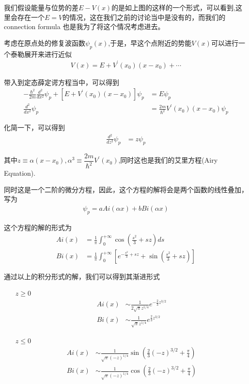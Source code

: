 \documentclass{article}
\begin{document}
我们假设能量与位势的差$E-V(x)$的是如上图的这样的一个形式，可以看到,这里会存在一个$E=V$的情况，这在我们之前的讨论当中是没有的，而我们的 connection formula 也是我为了将这个情况考虑进去。

考虑在原点处的修复波函数$\psi_p(x)$,于是，早这个点附近的势能$V(x)$可以进行一个泰勒展开来进行近似
\begin{align*}
    V(x)=E+V^\prime(x_0)(x-x_0)+\cdots
\end{align*}

带入到定态薛定谔方程当中，可以得到
\begin{align*}
    -\frac{\hbar^2}{2m}\frac{d^2}{dx^2}\psi_p+\left[E+V^\prime(x_0)(x-x_0)\right]\psi_p&=E\psi_p\\
    \frac{d^2}{dx^2}\psi_p&= \frac{2m}{\hbar^2}V^\prime(x_0)(x-x_0)\psi_p
\end{align*}

化简一下，可以得到
\begin{align*}
    \frac{d^2}{dz^2}\psi_p&= z\psi_p
\end{align*}

其中$z\equiv \alpha(x-x_0),\alpha^3\equiv \dfrac{2m}{\hbar^2}V^\prime(x_0)$,同时这也是我们的艾里方程(Airy Equation).

同时这是一个二阶的微分方程，因此，这个方程的解将会是两个函数的线性叠加，写为
\begin{align*}
    \psi_p=aAi(\alpha x)+bBi(\alpha x) 
\end{align*}

这个方程的解的形式为
\begin{align*}
    Ai(x)&=\frac{1}{\pi}\int_{0}^{+\infty}\cos(\frac{s^2}{3}+sz)ds\\
    Bi(x)&=\frac{1}{\pi}\int_{0}^{+\infty}\left[e^{-\frac{s^2}{3}+sz}+\sin(\frac{s^2}{3}+sz)\right]
\end{align*}

通过以上的积分形式的解，我们可以得到其渐进形式
\begin{enumerate}
    \item[$z\geq  0$] 
    \begin{align*}
        Ai(x)&\sim \frac{1}{2\sqrt{\pi}z^{1/4}}e^{-\frac{2}{3}z^{3/2}}\\
        Bi(x)&\sim \frac{1}{\sqrt{\pi}z^{1/4}}e^{\frac{2}{3}z^{3/2}}
    \end{align*}
    \item[$z\leq 0$] 
    \begin{align*}
        Ai(x)&\sim \frac{1}{\sqrt{\pi}(-z)^{1/4}}\sin(\frac{2}{3}(-z)^{3/2}+\frac{\pi}{4})\\
        Bi(x)&\sim \frac{1}{\sqrt{\pi}(-z)^{1/4}}\cos(\frac{2}{3}(-z)^{3/2}+\frac{\pi}{4})
    \end{align*}
\end{enumerate}
\end{document}
